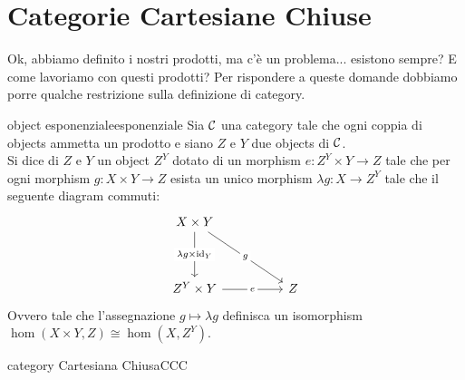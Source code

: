 \documentclass{article}
\renewcommand\C{\mc{C}}
\begin{document}
\section{Categorie Cartesiane Chiuse}

Ok, abbiamo definito i nostri prodotti, ma c'è un problema... esistono sempre? E come lavoriamo con questi prodotti? Per rispondere a queste domande dobbiamo porre qualche restrizione sulla definizione di category.

\begin{definition}{object esponenziale}{esponenziale}
    Sia $\C$ una category tale che ogni coppia di objects ammetta un prodotto e siano $Z$ e $Y$ due objects di $\C$.\\
    Si dice  di $Z$ e $Y$ un object $Z^Y$ dotato di un morphism $e: Z^Y\times Y \to Z$ tale che per ogni morphism $g : X\times Y \to Z$ esista un unico morphism $\lambda g : X\to Z^Y$ tale che il seguente diagram commuti:
    \[\begin{tikzcd}
    	{X\times Y} \\
    	\\
    	{Z^Y\times Y} && Z
    	\arrow["{\lambda g\times \id_Y}"{description}, from=1-1, to=3-1]
    	\arrow["g"{description}, from=1-1, to=3-3]
    	\arrow["e"{description}, from=3-1, to=3-3]
    \end{tikzcd}\]
    Ovvero tale che l'assegnazione $g \mapsto \lambda g$ definisca un isomorphism $\hom(X\times Y, Z)\cong \hom(X, Z^Y)$.
\end{definition}

\begin{definition}{category Cartesiana Chiusa}{CCC}
    
\end{definition}
\end{document}
